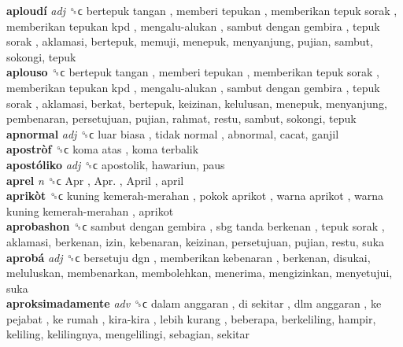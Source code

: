 \textbf{aploudí} \emph{adj}  ␝ϲ   bertepuk tangan ,  memberi tepukan ,  memberikan tepuk sorak ,  memberikan tepukan kpd ,  mengalu-alukan ,  sambut dengan gembira ,  tepuk sorak , aklamasi, bertepuk, memuji, menepuk, menyanjung, pujian, sambut, sokongi, tepuk  \\
\textbf{aplouso} ␝ϲ   bertepuk tangan ,  memberi tepukan ,  memberikan tepuk sorak ,  memberikan tepukan kpd ,  mengalu-alukan ,  sambut dengan gembira ,  tepuk sorak , aklamasi, berkat, bertepuk, keizinan, kelulusan, menepuk, menyanjung, pembenaran, persetujuan, pujian, rahmat, restu, sambut, sokongi, tepuk  \\
\textbf{apnormal} \emph{adj}  ␝ϲ   luar biasa ,  tidak normal , abnormal, cacat, ganjil  \\
\textbf{apostròf} ␝ϲ   koma atas ,  koma terbalik   \\
\textbf{apostóliko} \emph{adj}  ␝ϲ  apostolik, hawariun, paus  \\
\textbf{aprel} \emph{n}  ␝ϲ   Apr ,  Apr. ,  April , april  \\
\textbf{aprikòt} ␝ϲ   kuning kemerah-merahan ,  pokok aprikot ,  warna aprikot ,  warna kuning kemerah-merahan , aprikot  \\
\textbf{aprobashon} ␝ϲ   sambut dengan gembira ,  sbg tanda berkenan ,  tepuk sorak , aklamasi, berkenan, izin, kebenaran, keizinan, persetujuan, pujian, restu, suka  \\
\textbf{aprobá} \emph{adj}  ␝ϲ   bersetuju dgn ,  memberikan kebenaran , berkenan, disukai, meluluskan, membenarkan, membolehkan, menerima, mengizinkan, menyetujui, suka  \\
\textbf{aproksimadamente} \emph{adv}  ␝ϲ   dalam anggaran ,  di sekitar ,  dlm anggaran ,  ke pejabat ,  ke rumah ,  kira-kira ,  lebih kurang , beberapa, berkeliling, hampir, keliling, kelilingnya, mengelilingi, sebagian, sekitar  \\
